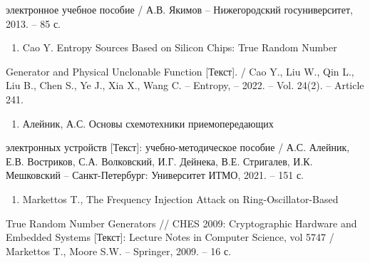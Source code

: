 электронное учебное пособие / А.В. Якимов -- Нижегородский
госуниверситет, 2013. -- 85 с.

\begin{enumerate}
\def\labelenumi{\arabic{enumi}}
\setcounter{enumi}{11}
\item
  Cao Y. Entropy Sources Based on Silicon Chips: True Random Number
\end{enumerate}

Generator and Physical Unclonable Function {[}Текст{]}. / Cao Y., Liu
W., Qin L., Liu B., Chen S., Ye J., Xia X., Wang C. -- Entropy, -- 2022.
-- Vol. 24(2). -- Article 241.

\begin{enumerate}
\def\labelenumi{\arabic{enumi}}
\setcounter{enumi}{12}
\item
  Алейник, А.С. Основы схемотехники приемопередающих
\end{enumerate}

электронных устройств {[}Текст{]}: учебно-методическое пособие / А.С.
Алейник, Е.В. Востриков, С.А. Волковский, И.Г. Дейнека, В.Е. Стригалев,
И.К. Мешковский -- Санкт-Петербург: Университет ИТМО, 2021. -- 151 с.

\begin{enumerate}
\def\labelenumi{\arabic{enumi}}
\setcounter{enumi}{13}
\item
  Markettos T., The Frequency Injection Attack on Ring-Oscillator-Based
\end{enumerate}

True Random Number Generators // CHES 2009: Cryptographic Hardware and
Embedded Systems {[}Текст{]}: Lecture Notes in Computer Science, vol
5747 / Markettos T., Moore S.W. -- Springer, 2009. -- 16 с.

